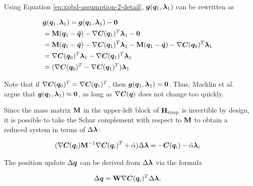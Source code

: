 \noindent Using Equation \ref{eq:xpbd-assumption-2-detail}, $\bm{g}(\bm{q}_1, \bm{\lambda}_1)$ can be rewritten as

\begin{equation}
\begin{split}
    &\bm{g}(\bm{q}_1, \bm{\lambda}_1) = \bm{g}(\bm{q}_1, \bm{\lambda}_1) - \bm{0} \\
    &= \mathbf{M}(\bm{q}_1 - \tilde{\bm{q}}) - \nabla \bm{C}(\bm{q}_1)^T \bm{\lambda}_1 - \bm{0} \\
    &= \mathbf{M}(\bm{q}_1 - \tilde{\bm{q}}) - \nabla \bm{C}(\bm{q}_1)^T \bm{\lambda}_1 
    - \mathbf{M}(\bm{q}_1 - \tilde{\bm{q}}) - \nabla \bm{C}(\bm{q}_0)^T \bm{\lambda}_1 \\
    &= \nabla \bm{C}(\bm{q}_0)^T \bm{\lambda}_1 - \nabla \bm{C}(\bm{q}_1)^T \bm{\lambda}_1 \\
    &= (\nabla \bm{C}(\bm{q}_0)^T - \nabla \bm{C}(\bm{q}_1)^T) \bm{\lambda}_1
\end{split}
\end{equation}

\noindent Note that if $\nabla \bm{C}(\bm{q}_0)^T = \nabla \bm{C}(\bm{q}_1)^T$, then 
$\bm{g}(\bm{q}_1, \bm{\lambda}_1) = \bm{0}$. Thus, Macklin et al.\ \cite{macklin2016} argue that 
$\bm{g}(\bm{q}_1, \bm{\lambda}_1) \approx \bm{0}$, as long as $\nabla \bm{C}(\bm{q})$ 
does not change too quickly.

Since the mass matrix $\mathbf{M}$ in the upper-left block of $\mathbf{H}_{\text{simp}}$ is invertible by design, it is possible
to take the Schur complement with respect to $\mathbf{M}$ to obtain a reduced system in terms of $\Delta \bm{\lambda}$:

\begin{equation}\label{eq:xpbd-schur}
    (\nabla \bm{C}(\bm{q}_i) \mathbf{M}^{-1} \nabla \bm{C}(\bm{q}_i)^T + \tilde{\mathbf{\alpha}}) \Delta \bm{\lambda} = -\bm{C}(\bm{q}_i) - 
    \tilde{\mathbf{\alpha}}\bm{\lambda}_i
\end{equation}

\noindent The position update $\Delta \bm{q}$ can be derived from $\Delta \bm{\lambda}$ via the formula

\begin{equation}\label{eq:xpbd-position-update}
    \Delta \bm{q} = \mathbf{W} \nabla \bm{C}(\bm{q}_i)^T \Delta \bm{\lambda},
\end{equation}

